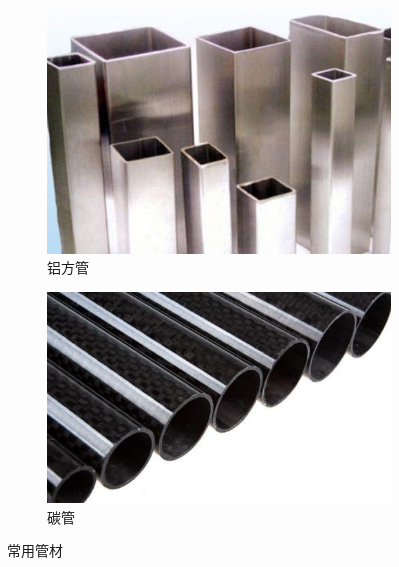 \documentclass[UTF8]{article} %
\begin{document}
\begin{figure}[H]
  \centering
  \begin{subfigure}[b]{0.39\textwidth}
         \centering
         \includegraphics[width=\textwidth]{lv.png}
          \caption{铝方管}
          \label{f4}
  \end{subfigure}
  \quad
  \begin{subfigure}[b]{0.45\textwidth}
          \centering
          \includegraphics[width=\textwidth]{tan.png}
          \caption{碳管}
          \label{f5}
  \end{subfigure}
  \caption{常用管材 }
  \label{wg}
\end{figure}
\end{document}

